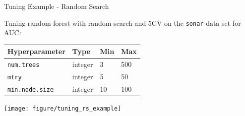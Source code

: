 \begin{vbframe}{Tuning Example - Random Search}

Tuning random forest with random search and 5CV on the \texttt{sonar} data set for AUC:

\begin{footnotesize}
\begin{center}
\begin{tabular}{|l|l|l|l}
Hyperparameter          &  Type     & Min & Max \\
\hline
\texttt{num.trees}     & integer  & 3 & 500 \\
\texttt{mtry}          & integer  & 5 & 50  \\
\texttt{min.node.size} & integer  & 10 & 100\\
\end{tabular}
\end{center}
\end{footnotesize}

\begin{knitrout}\scriptsize
{}\color{fgcolor}

{\centering \texttt{[image: figure/tuning\_rs\_example]}
}


\end{knitrout}

\end{vbframe}

\endlecture

